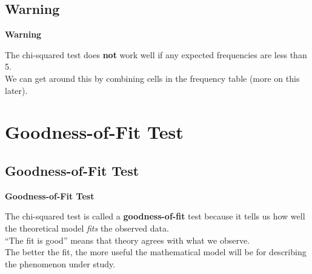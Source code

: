 \documentclass[compress]{beamer}        %
\makeatletter
\newcommand{\tcb}{\textcolor{beamer@blendedblue}}
\makeatother
\begin{document}
\subsection{Warning}
\begin{frame}{\bf \tcb{Warning}}


The chi-squared test does {\bf not} work well if any expected frequencies are less than 5.\\[0.8cm]

We can get around this by combining cells in the frequency table (more on this later).



\end{frame}








\section{Goodness-of-Fit Test}
\subsection{Goodness-of-Fit Test}
\begin{frame}{\bf \tcb{Goodness-of-Fit Test}}

The chi-squared test is called a {\bf goodness-of-fit} test because it tells us how well the theoretical model \emph{fits} the observed data.\\[1.2cm]

``The fit is good'' means that theory agrees with what we observe.\\[1.2cm]

The better the fit, the more useful the mathematical model will be for describing the phenomenon under study.



\end{frame}
\end{document}
